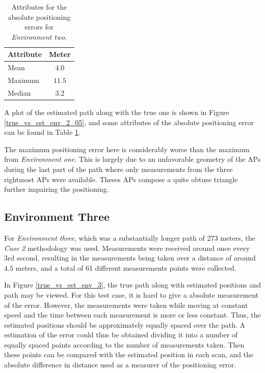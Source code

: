 \documentclass{LTHthesis}
\begin{document}
%
\begin{table}[!hbt]
\begin{center}
\begin{tabular}{|l|c|}
\hline
\multicolumn{1}{|c|}{Attribute} & Meter \\
\hline
\hline
Mean & $4.0$ \\
\hline
Maximum & $11.5$\\
\hline
Median & $3.2$ \\
\hline 
\end{tabular}
\end{center}
\caption{Attributes for the absolute positioning errors for \emph{Environment two}.}\label{table:error_env_2}
\end{table}

A plot of the estimated path along with the true one is shown in Figure \ref{true_vs_est_env_2_05}, and some attributes of the absolute positioning error can be found in Table \ref{table:error_env_2}.

The maximum positioning error here is considerably worse than the maximum from \emph{Environment one}. This is largely due to an unfavorable geometry of the APs during the last part of the path where only measurements from the three rightmost APs were available. Theses APs compose a quite obtuse triangle further impairing the positioning.  
%
\subsection{Environment Three}
%
For \emph{Environment three}, which was a substantially longer path of 273 meters, the \emph{Case 2} methodology was used. Measurements were received around once every 3rd second, resulting in the measurements being taken over a distance of around $4.5$ meters, and a total of 61 different measurements points were collected. 

In Figure \ref{true_vs_est_env_3}, the true path along with estimated positions and path may be viewed. For this test case, it is hard to give a absolute measurement of the error. However, the measurements were taken while moving at constant speed and the time between each measurement is more or less constant. Thus, the estimated positions should be approximately equally spaced over the path. A estimation of the error could thus be obtained dividing it into a number of equally spaced points according to the number of measurements taken. Then these points can be compared with the estimated position in each scan, and the absolute difference in distance used as a measurer of the positioning error.
\end{document}
